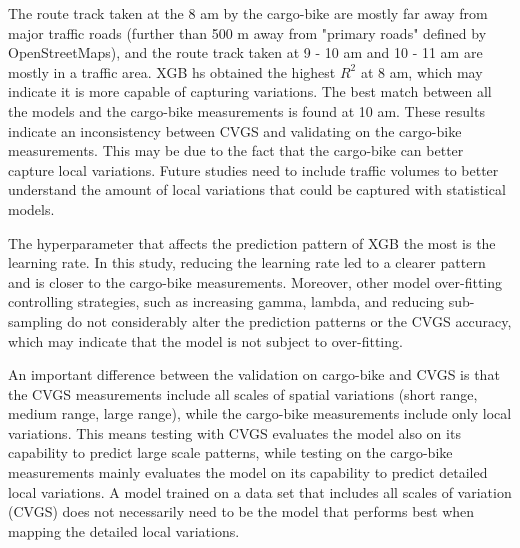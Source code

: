 \documentclass{article}
\begin{document}
The route track taken at the 8 am by the cargo-bike are mostly far away from major traffic roads (further than 500 m away from "primary roads" defined by OpenStreetMaps), and the route track taken at 9 - 10 am and 10 - 11 am are mostly in a traffic area. XGB hs obtained the highest $R^2$ at 8 am, which may indicate it is more capable of capturing variations. The best match between all the models and the cargo-bike measurements is found at 10 am. These results indicate an inconsistency between CVGS and validating on the cargo-bike measurements. This may be due to the fact that the cargo-bike can better capture local variations. Future studies need to include traffic volumes to better understand the amount of local variations that could be captured with statistical models. 

The hyperparameter that affects the prediction pattern of XGB the most is the learning rate. In this study, reducing the learning rate led to a clearer pattern and is closer to the cargo-bike measurements. Moreover, other model over-fitting controlling strategies, such as increasing gamma, lambda, and reducing sub-sampling do not considerably alter the prediction patterns or the CVGS accuracy, which may indicate that the model is not subject to over-fitting.  


An important difference between the validation on cargo-bike and CVGS is that the CVGS measurements include all scales of spatial variations (short range, medium range, large range), while the cargo-bike measurements include only local variations. This means testing with CVGS evaluates the model also on its capability to predict large scale patterns, while testing on the cargo-bike measurements mainly evaluates the model on its capability to predict detailed local variations. A model trained on a data set that includes all scales of variation (CVGS) does not necessarily need to be the model that performs best when mapping the detailed local variations.
\end{document}
